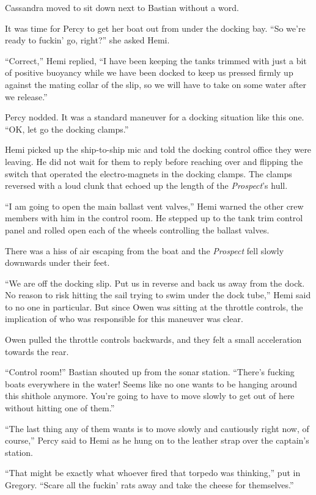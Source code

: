 \documentclass[
]{scrbook}
\begin{document}
Cassandra moved to sit down next to Bastian without a word.

It was time for Percy to get her boat out from under the docking bay.
``So we're ready to fuckin' go, right?'' she asked Hemi.

``Correct,'' Hemi replied, ``I have been keeping the tanks trimmed with
just a bit of positive buoyancy while we have been docked to keep us
pressed firmly up against the mating collar of the slip, so we will have
to take on some water after we release.''

Percy nodded. It was a standard maneuver for a docking situation like
this one. ``OK, let go the docking clamps.''

Hemi picked up the ship-to-ship mic and told the docking control office
they were leaving. He did not wait for them to reply before reaching
over and flipping the switch that operated the electro-magnets in the
docking clamps. The clamps reversed with a loud clunk that echoed up the
length of the \emph{Prospect}'s hull.

``I am going to open the main ballast vent valves,'' Hemi warned the
other crew members with him in the control room. He stepped up to the
tank trim control panel and rolled open each of the wheels controlling
the ballast valves.

There was a hiss of air escaping from the boat and the \emph{Prospect}
fell slowly downwards under their feet.

``We are off the docking slip. Put us in reverse and back us away from
the dock. No reason to risk hitting the sail trying to swim under the
dock tube,'' Hemi said to no one in particular. But since Owen was
sitting at the throttle controls, the implication of who was responsible
for this maneuver was clear.

Owen pulled the throttle controls backwards, and they felt a small
acceleration towards the rear.

``Control room!'' Bastian shouted up from the sonar station. ``There's
fucking boats everywhere in the water! Seems like no one wants to be
hanging around this shithole anymore. You're going to have to move
slowly to get out of here without hitting one of them.''

``The last thing any of them wants is to move slowly and cautiously
right now, of course,'' Percy said to Hemi as he hung on to the leather
strap over the captain's station.

``That might be exactly what whoever fired that torpedo was thinking,''
put in Gregory. ``Scare all the fuckin' rats away and take the cheese
for themselves.''
\end{document}
